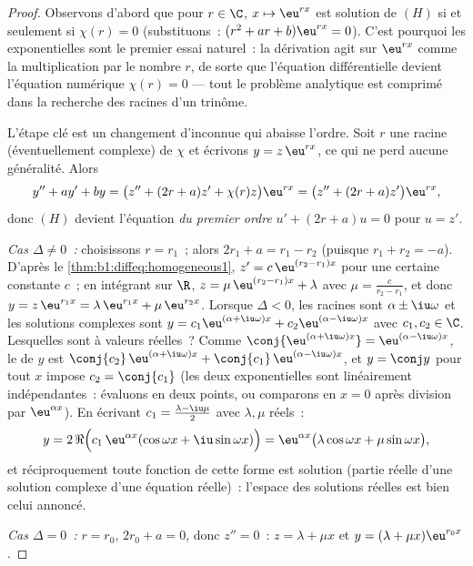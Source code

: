 \begin{proof}
Observons d'abord que pour $r \in \C$, $x \mapsto \eu^{rx}$ est
solution de $(H)$ si et seulement si $\chi(r) = 0$ (substituons~:
$(r^2 + ar + b)\eu^{rx} = 0$). C'est pourquoi les exponentielles sont
le premier essai naturel~: la dérivation agit sur $\eu^{rx}$ comme la
multiplication par le nombre $r$, de sorte que l'équation
différentielle devient l'équation numérique $\chi(r) = 0$ --- tout le
problème analytique est comprimé dans la recherche des racines d'un
trinôme.

L'étape clé est un changement d'inconnue qui abaisse l'ordre. Soit $r$
une racine (éventuellement complexe) de $\chi$ et écrivons $y = z\,
\eu^{rx}$, ce qui ne perd aucune généralité. Alors
\[
y'' + ay' + by
= \bigl(z'' + (2r + a) z' + \chi(r) z\bigr)\eu^{rx}
= \bigl(z'' + (2r + a) z'\bigr)\eu^{rx},
\]
donc $(H)$ devient l'équation \emph{du premier ordre} $u' + (2r + a) u
= 0$ pour $u = z'$.

\emph{Cas $\Delta \neq 0$~:} choisissons $r = r_1$~; alors $2r_1 + a =
r_1 - r_2$ (puisque $r_1 + r_2 = -a$). D'après
le \cref{thm:b1:diffeq:homogeneous1}, $z' = c\,\eu^{(r_2 - r_1)x}$ pour
une certaine constante $c$~; en intégrant sur $\R$, $z = \mu\,
\eu^{(r_2 - r_1)x} + \lambda$ avec $\mu = \frac{c}{r_2 - r_1}$, et
donc $y = z\, \eu^{r_1 x} = \lambda\,\eu^{r_1x} + \mu\,\eu^{r_2x}$.
Lorsque $\Delta < 0$, les racines sont $\alpha \pm \iu\omega$ et les
solutions complexes sont $y = c_1\eu^{(\alpha+\iu\omega)x} +
c_2\eu^{(\alpha-\iu\omega)x}$ avec $c_1, c_2 \in \C$. Lesquelles sont
à valeurs réelles~? Comme $\conj{\eu^{(\alpha+\iu\omega)x}} =
\eu^{(\alpha-\iu\omega)x}$, le  de $y$ est $\conj{c_2}\,
\eu^{(\alpha+\iu\omega)x} + \conj{c_1}\,\eu^{(\alpha-\iu\omega)x}$, et
$y = \conj y$ pour tout $x$ impose $c_2 = \conj{c_1}$ (les deux
exponentielles sont linéairement indépendantes~: évaluons en deux
points, ou comparons en $x=0$ après division par $\eu^{\alpha x}$). En
écrivant $c_1 = \frac{\lambda - \iu\mu}2$ avec $\lambda, \mu$ réels~:
\[
y = 2\,\Re\Bigl(c_1\,\eu^{\alpha x}(\cos\omega x +
\iu\sin\omega x)\Bigr)
= \eu^{\alpha x}\bigl(\lambda\cos\omega x + \mu\sin\omega
x\bigr),
\]
et réciproquement toute fonction de cette forme est solution (partie
réelle d'une solution complexe d'une équation réelle)~: l'espace des
solutions réelles est bien celui annoncé.

\emph{Cas $\Delta = 0$~:} $r = r_0$, $2r_0 + a = 0$, donc $z'' = 0$~:
$z = \lambda + \mu x$ et $y = (\lambda + \mu x)\eu^{r_0 x}$.
\end{proof}

